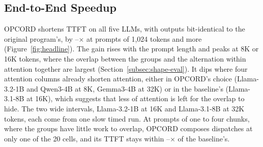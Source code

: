 \subsection{End-to-End Speedup}
\label{subsec:e2e}

OPCORD shortens TTFT on all five LLMs, with outputs bit-identical to the original program's, by \PrefillGainLo--\PrefillGainHi$\times$ at prompts of 1{,}024 tokens and more (Figure~\ref{fig:headline}).
The gain rises with the prompt length and peaks at 8K or 16K tokens, where the overlap between the groups and the alternation within attention together are largest (Section~\ref{subsec:shape-eval}).
It dips where four attention columns already shorten attention, either in OPCORD's choice (Llama-3.2-1B and Qwen3-4B at 8K, Gemma3-4B at 32K) or in the baseline's (Llama-3.1-8B at 16K), which suggests that less of attention is left for the overlap to hide.
The two wide intervals, Llama-3.2-1B at 16K and Llama-3.1-8B at 32K tokens, each come from one slow timed run.
At prompts of one to four chunks, where the groups have little work to overlap, OPCORD composes dispatches at only one of the 20 cells, and its TTFT stays within \ShortGainLo--\ShortGainHi$\times$ of the baseline's.

